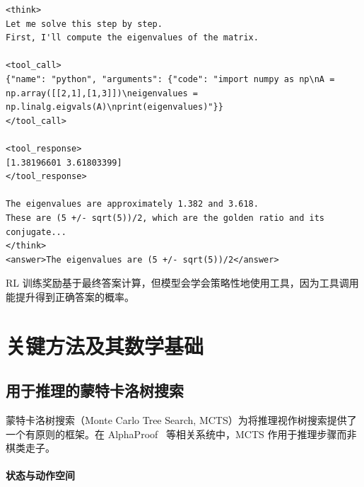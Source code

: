 \begin{lstlisting}[style=pythonstyle, caption={QwQ 中的工具集成推理格式}]
<think>
Let me solve this step by step.
First, I'll compute the eigenvalues of the matrix.

<tool_call>
{"name": "python", "arguments": {"code": "import numpy as np\nA = np.array([[2,1],[1,3]])\neigenvalues = np.linalg.eigvals(A)\nprint(eigenvalues)"}}
</tool_call>

<tool_response>
[1.38196601 3.61803399]
</tool_response>

The eigenvalues are approximately 1.382 and 3.618.
These are (5 +/- sqrt(5))/2, which are the golden ratio and its conjugate...
</think>
<answer>The eigenvalues are (5 +/- sqrt(5))/2</answer>
\end{lstlisting}

RL 训练奖励基于最终答案计算，但模型会学会策略性地使用工具，因为工具调用能提升得到正确答案的概率。

\section{关键方法及其数学基础}
\label{subsec:reasoning_methods}

\subsection{用于推理的蒙特卡洛树搜索}
\label{subsubsec:mcts_reasoning}

蒙特卡洛树搜索（Monte Carlo Tree Search, MCTS）为将推理视作树搜索提供了一个有原则的框架。在 AlphaProof~\cite{alphaproof2024} 等相关系统中，MCTS 作用于推理步骤而非棋类走子。

\paragraph{状态与动作空间}
\label{state-and-action-space}


